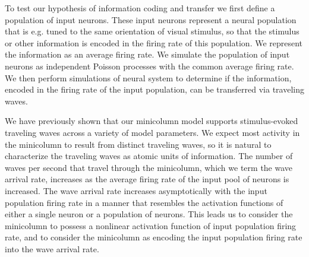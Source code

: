 To test our hypothesis of information coding and transfer we first define a population of input neurons.
These input neurons represent a neural population that is e.g. tuned to the same orientation of visual stimulus, 
so that the stimulus or other information is encoded in the firing rate of this population.
We represent the information as an average firing rate.
We simulate the population of input neurons as independent Poisson processes with the common average firing rate.
We then perform simulations of neural system to determine if the information, encoded in the firing rate of the input population,
can be transferred via traveling waves.

We have previously shown that our minicolumn model supports stimulus-evoked traveling waves across a variety of model parameters.
We expect most activity in the minicolumn to result from distinct traveling waves, so it is natural to characterize the traveling waves as atomic units of information.
The number of waves per second that travel through the minicolumn, which we term the wave arrival rate, increases as the average firing rate of the input pool of neurons is increased.
The wave arrival rate increases asymptotically with the input population firing rate in a manner that resembles the activation functions of either a single neuron or a population of neurons.
This leads us to consider the minicolumn to possess a nonlinear activation function of input population firing rate, 
and to consider the minicolumn as encoding the input population firing rate into the wave arrival rate.


